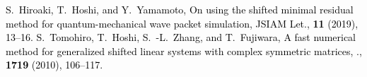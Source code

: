 


\setlength{\baselineskip}{40pt}
\textcolor{black}{
\begin{thebibliography}{7}
	\vspace{-2mm}
		S.~Hiroaki, T.~Hoshi, and Y.~Yamamoto,
		\newblock On using the shifted minimal residual method for quantum-mechanical wave packet simulation,
		JSIAM Let., {\bf 11} (2019), 13--16.
		S.~Tomohiro, T.~Hoshi, S.~-L.~Zhang, and T.~Fujiwara,
		\newblock A fast numerical method for generalized shifted linear systems with complex symmetric matrices,
		., {\bf 1719} (2010), 106--117.
\end{thebibliography}
}


\begin{comment}




	\bibitem{ref-SeitoH-2019}
		S.~Hiroaki, T.~Hoshi, and Y.~Yamamoto,
		\newblock On using the shifted minimal residual method for quantum-mechanical wave packet simulation,
		\newblock JSIAM Let., {\bf 11} (2019), 13--16.
	\bibitem{ref-SogabeT-2010}
		S.~Tomohiro et.al.,
		\newblock A fast numerical method for generalized shifted linear systems with complex symmetric matrices,
		\newblock 数理解析研究所講究録., {\bf 1719} (2010), 106--117.


\end{comment}
